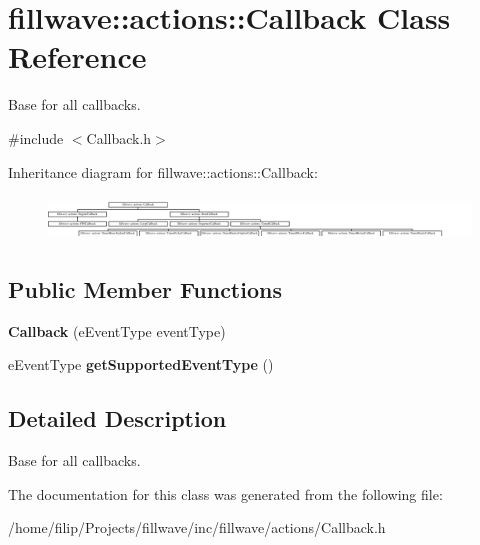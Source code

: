 \hypertarget{classfillwave_1_1actions_1_1Callback}{}\section{fillwave\+:\+:actions\+:\+:Callback Class Reference}
\label{classfillwave_1_1actions_1_1Callback}


Base for all callbacks.  




{\ttfamily \#include $<$Callback.\+h$>$}

Inheritance diagram for fillwave\+:\+:actions\+:\+:Callback\+:\begin{figure}[H]
\begin{center}
\leavevmode
\includegraphics[height=1.180812cm]{classfillwave_1_1actions_1_1Callback}
\end{center}
\end{figure}
\subsection*{Public Member Functions}
\begin{DoxyCompactItemize}
\item 
\hypertarget{classfillwave_1_1actions_1_1Callback_a335073b7711a88b49b6843c6141784c2}{}{\bfseries Callback} (e\+Event\+Type event\+Type)\label{classfillwave_1_1actions_1_1Callback_a335073b7711a88b49b6843c6141784c2}

\item 
\hypertarget{classfillwave_1_1actions_1_1Callback_acc454aa8b6d8f16c40979adecc5f4d14}{}e\+Event\+Type {\bfseries get\+Supported\+Event\+Type} ()\label{classfillwave_1_1actions_1_1Callback_acc454aa8b6d8f16c40979adecc5f4d14}

\end{DoxyCompactItemize}


\subsection{Detailed Description}
Base for all callbacks. 

The documentation for this class was generated from the following file\+:\begin{DoxyCompactItemize}
\item 
/home/filip/\+Projects/fillwave/inc/fillwave/actions/Callback.\+h\end{DoxyCompactItemize}
